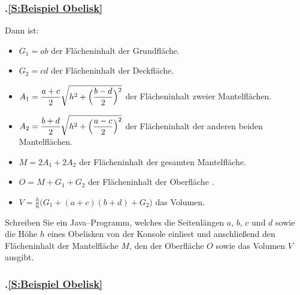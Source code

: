 \begin{frame}[t]%
    \frametitle{\kap.\ref{S:Beispiel Obelisk} \stitle}%
\medskip
Dann ist:
\begin{itemize}
\item $G_1 = ab$ der Fl\"acheninhalt der Grundfl\"ache.
\item $G_2 = cd$ der Fl\"acheninhalt der Deckfl\"ache.
\item $\displaystyle A_1 = \frac{a+c}{2} \sqrt{h^2 + \Bigl(\frac{b-d}{2}\Bigr)^2}$
der Fl\"acheninhalt zweier Mantelfl\"achen.
\item $\displaystyle A_2 = \frac{b+d}{2} \sqrt{h^2 + \Bigl(\frac{a-c}{2}\Bigr)^2}$
der Fl\"acheninhalt der anderen beiden Mantelfl\"achen.
\item $M = 2 A_1 + 2 A_2$ der Fl\"acheninhalt der gesamten Mantelfl\"ache.
\item $O = M + G_1 + G_2$ der Fl\"acheninhalt der Oberfl\"ache .
\item $\displaystyle V = \frac{h}{6}\bigl(G_1 + (a+c)(b+d) + G_2\bigr)$ das Volumen.
\end{itemize}
\medskip

Schreiben Sie ein Java--Programm, welches die Seitenl\"angen $a$, $b$, $c$ und $d$ sowie
die H\"ohe $h$ eines Obelisken von der Konsole einliest und anschlie\ss end den Fl\"acheninhalt
der Mantelfl\"ache $M$, den der Oberfl\"ache $O$ sowie das Volumen $V$ ausgibt.

\end{frame}

\begin{frame}[t]%
    \frametitle{\kap.\ref{S:Beispiel Obelisk} \stitle}%
\medskip


\end{frame}

